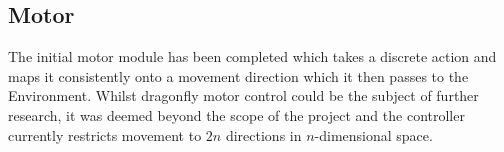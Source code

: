 \subsection{Motor}

The initial motor module has been completed which takes a discrete action and maps it consistently onto a movement direction which it then passes to the Environment. Whilst dragonfly motor control could be the subject of further research, it was deemed beyond the scope of the project and the controller currently restricts movement to $2n$ directions in $n$-dimensional space.